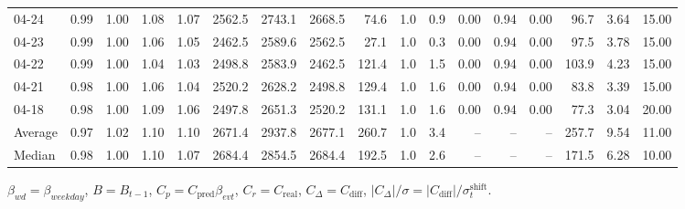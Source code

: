 \begin{threeparttable}
{\begin{tabular}{lrrrrrrrrrrrrrrrr}
  04-24 &         0.99 &           1.00 &          1.08 &          1.07 & 2562.5 & 2743.1 & 2668.5 &       74.6 &                      1.0 &                 0.9 &       0.00 &      0.94 &           0.00 &             96.7 &            3.64 &                  15.00 \\
  04-23 &         0.99 &           1.00 &          1.06 &          1.05 & 2462.5 & 2589.6 & 2562.5 &       27.1 &                      1.0 &                 0.3 &       0.00 &      0.94 &           0.00 &             97.5 &            3.78 &                  15.00 \\
  04-22 &         0.99 &           1.00 &          1.04 &          1.03 & 2498.8 & 2583.9 & 2462.5 &      121.4 &                      1.0 &                 1.5 &       0.00 &      0.94 &           0.00 &            103.9 &            4.23 &                  15.00 \\
  04-21 &         0.98 &           1.00 &          1.06 &          1.04 & 2520.2 & 2628.2 & 2498.8 &      129.4 &                      1.0 &                 1.6 &       0.00 &      0.94 &           0.00 &             83.8 &            3.39 &                  15.00 \\
  04-18 &         0.98 &           1.00 &          1.09 &          1.06 & 2497.8 & 2651.3 & 2520.2 &      131.1 &                      1.0 &                 1.6 &       0.00 &      0.94 &           0.00 &             77.3 &            3.04 &                  20.00 \\
Average &         0.97 &           1.02 &          1.10 &          1.10 & 2671.4 & 2937.8 & 2677.1 &      260.7 &                      1.0 &                 3.4 &         -- &        -- &             -- &            257.7 &            9.54 &                  11.00 \\
 Median &         0.98 &           1.00 &          1.10 &          1.07 & 2684.4 & 2854.5 & 2684.4 &      192.5 &                      1.0 &                 2.6 &         -- &        -- &             -- &            171.5 &            6.28 &                  10.00 \\
\bottomrule
\end{tabular}
}
\begin{tablenotes}\footnotesize
\item $\beta_{wd}=\beta_{weekday}$, $B=B_{t-1}$,
$C_p=C_{\text{pred}}\beta_{evt}$, $C_r=C_{\text{real}}$,
$C_\Delta=C_{\text{diff}}$, $|C_\Delta|/\sigma=|C_{\text{diff}}|/\sigma_t^{\text{shift}}$.
\end{tablenotes}
\end{threeparttable}
\endgroup
